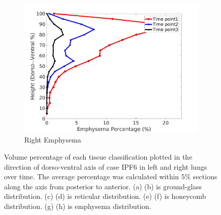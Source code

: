 \begin{figure}[H]
\begin{subfigure}{.42\linewidth}
  \includegraphics[width=\linewidth,trim={{.0\wd0} {.0\wd0} {.0\wd0} {.0\wd0}},clip]{Appendix/Image_AppexA/DorsoToVentral/IPF6RightLungEmphysemaDiseaseDorsoToVentral.jpg}
  \caption{Right Emphysema}
  \label{fig:IPF6DiseaseDorsoToVentral-h}
\end{subfigure}
\caption{Volume percentage of each tissue classification plotted in the direction of dorso-ventral axis of case IPF6 in left and right lungs over time. The average percentage was calculated within 5\% sections along the axis from posterior to anterior. (a) (b) is ground-glass distribution. (c) (d) is reticular distribution. (e) (f) is honeycomb distribution. (g) (h) is emphysema distribution.}
\label{fig:IPF6DiseaseDorsoToVentral}
\end{figure}

